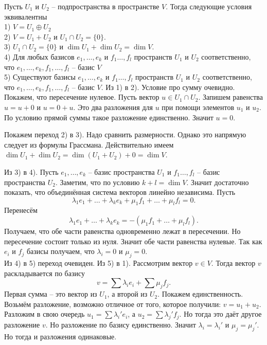  Пусть $U_1$ и $U_2$ -- подпространства в пространстве $V$. Тогда следующие условия эквивалентны\\
1) $V=U_1\oplus U_2$\\
2) $V=U_1+U_2$ и $U_1\cap U_2=\{0\}$.\\
3) $U_1\cap U_2=\{0\}$ и $\dim U_1+\dim U_2=\dim V$.\\
4) Для любых базисов $e_1,\dots,e_k$   и $f_1\dots,f_l$ пространств $U_1$ и $U_2$ соответственно, что  $e_1,\dots,e_k,f_1,\dots,f_l$ -- базис $V$\\
5) Существуют базисы $e_1,\dots,e_k$   и $f_1\dots,f_l$ пространств $U_1$ и $U_2$ соответственно, что $e_1,\dots,e_k,f_1,\dots,f_l$ -- базис $V$.
\ethrm
\proof Из 1) в 2). Условие про сумму очевидно. Покажем, что пересечение нулевое. Пусть вектор $u \in U_1\cap U_2$. Запишем равенства $u=u+0$ и $u=0+u$. Это два разложения для $u$ при помощи элементов $u_1$ и $u_2$. По условию прямой суммы такое разложение единственно. Значит $u=0$.


Покажем переход 2) в 3). Надо сравнить размерности. Однако это напрямую следует из формулы Грассмана. Действительно имеем $\dim U_1 + \dim U_2=\dim (U_1+U_2) + 0 = \dim V$.


Из 3) в 4). Пусть $e_1,\dots,e_k$ -- базис пространства $U_1$ и $f_1\dots,f_l$ -- базис пространства $U_2$. Заметим, что по условию $k+l=\dim V$. Значит достаточно показать, что объединённая система векторов  линейно независима. Пусть 
$$\lambda_1 e_1+\dots+\lambda_ke_k+\mu_1f_1+\dots+\mu_lf_l=0.$$
Перенесём 
$$\lambda_1 e_1+\dots+\lambda_ke_k=-(\mu_1f_1+\dots+\mu_lf_l).$$
Получаем, что обе части равенства одновременно лежат в пересечении. Но пересечение состоит только из нуля. Значит обе части равенства нулевые. Так как $e_i$ и $f_j$ базисы получаем, что $\lambda_i=0$ и $\mu_j=0$.\\


Из 4) в 5) переход очевиден. Из 5) в 1). Рассмотрим вектор $v\in V$. Тогда вектор $v$ раскладывается по базису
$$v=\sum \lambda_i e_i + \sum \mu_j f_j.$$
Первая сумма -- это вектор из $U_1$, а второй из $U_2$. Покажем единственность. Возьмём разложение, возможно отличное от того, которое получили: $v=u_1+u_2$. Разложим в свою очередь $u_1=\sum \lambda_i'e_i$, а $u_2=\sum \lambda_j' f_j$. Но тогда это даёт другое разложение $v$. Но разложение по базису единственно. Значит $\lambda_i=\lambda_i'$ и $\mu_j=\mu_j'$. Но тогда и разложения одинаковые.

\endproof



